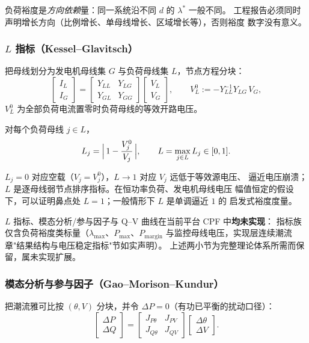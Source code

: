 \begin{remark}[裕度对方向的依赖]
负荷裕度是\emph{方向依赖}量：同一系统沿不同 $d$ 的 $\lambda^{*}$ 一般不同。
工程报告必须同时声明增长方向（比例增长、单母线增长、区域增长等），否则裕度
数字没有意义。
\end{remark}

\subsubsection*{$L$ 指标（Kessel--Glavitsch）}
把母线划分为发电机母线集 $G$ 与负荷母线集 $L$，节点方程分块：
\begin{equation}
\begin{bmatrix}I_L\\ I_G\end{bmatrix}
=
\begin{bmatrix}Y_{LL} & Y_{LG}\\ Y_{GL} & Y_{GG}\end{bmatrix}
\begin{bmatrix}V_L\\ V_G\end{bmatrix},
\qquad
V_L^{0}:=-Y_{LL}^{-1}Y_{LG}\,V_G,
\end{equation}
$V_L^{0}$ 为全部负荷电流置零时负荷母线的等效开路电压。

\begin{definition}
对每个负荷母线 $j\in L$，
\begin{equation}
L_j=\Bigl|\,1-\frac{V_j^{0}}{V_j}\,\Bigr|,\qquad
L=\max_{j\in L}L_j\in[0,1].
\end{equation}
\end{definition}
$L_j=0$ 对应空载（$V_j=V_j^{0}$），$L\to1$ 对应 $V_j$ 远低于等效源电压、
逼近电压崩溃；$L$ 是逐母线弱节点排序指标。在恒功率负荷、发电机母线电压
幅值恒定的假设下，可以证明鼻点处 $L=1$；一般情形下 $L$ 是单调逼近 $1$ 的
启发式裕度度量。

\begin{gapnote}
$L$ 指标、模态分析/参与因子与 Q--V 曲线在当前平台 CPF 中\textbf{均未实现}：
指标族仅含负荷裕度类标量（$\lambda_{\max}$、$P_{\max}$、$P_{\mathrm{margin}}$
与监控母线电压，实现层连续潮流章"结果结构与电压稳定指标"节如实声明）。
上述两小节为完整理论体系所需而保留，属未实现扩展。
\end{gapnote}

\subsubsection*{模态分析与参与因子（Gao--Morison--Kundur）}
把潮流雅可比按 $(\theta,V)$ 分块，并令 $\Delta P=0$（有功已平衡的扰动口径）：
\begin{equation}
\begin{bmatrix}\Delta P\\ \Delta Q\end{bmatrix}
=
\begin{bmatrix}J_{P\theta} & J_{PV}\\ J_{Q\theta} & J_{QV}\end{bmatrix}
\begin{bmatrix}\Delta\theta\\ \Delta V\end{bmatrix}.
\end{equation}


